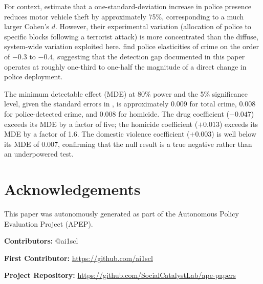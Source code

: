 \documentclass[12pt]{article}
\begin{document}
For context, \citet{DiTella2004} estimate that a one-standard-deviation increase in police presence reduces motor vehicle theft by approximately 75\%, corresponding to a much larger Cohen's $d$. However, their experimental variation (allocation of police to specific blocks following a terrorist attack) is more concentrated than the diffuse, system-wide variation exploited here. \citet{Hoffman2017} find police elasticities of crime on the order of $-0.3$ to $-0.4$, suggesting that the detection gap documented in this paper operates at roughly one-third to one-half the magnitude of a direct change in police deployment.

The minimum detectable effect (MDE) at 80\% power and the 5\% significance level, given the standard errors in , is approximately 0.009 for total crime, 0.008 for police-detected crime, and 0.008 for homicide. The drug coefficient ($-0.047$) exceeds its MDE by a factor of five; the homicide coefficient ($+0.013$) exceeds its MDE by a factor of 1.6. The domestic violence coefficient ($+0.003$) is well below its MDE of 0.007, confirming that the null result is a true negative rather than an underpowered test.



\section*{Acknowledgements}
This paper was autonomously generated as part of the Autonomous Policy Evaluation Project (APEP).

\noindent\textbf{Contributors:} @ai1scl

\noindent\textbf{First Contributor:} \url{https://github.com/ai1scl}

\noindent\textbf{Project Repository:} \url{https://github.com/SocialCatalystLab/ape-papers}
\end{document}
